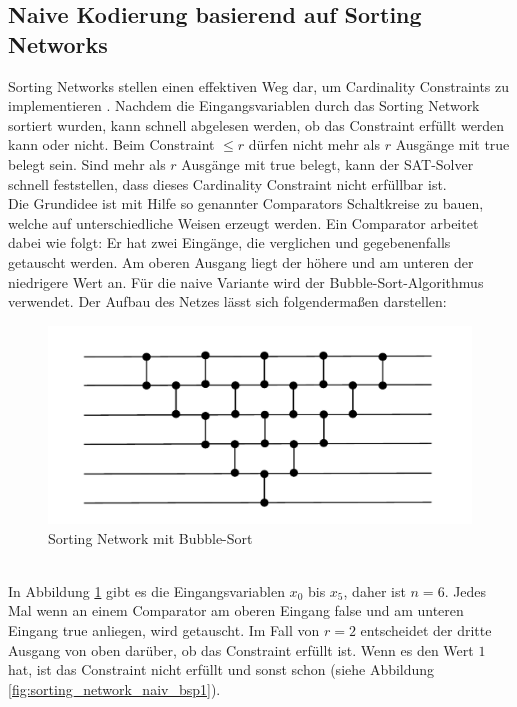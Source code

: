 \documentclass[a4,abstract=on]{scrartcl}
\begin{document}
	\subsection{Naive Kodierung basierend auf Sorting Networks}
Sorting Networks stellen einen effektiven Weg dar, um Cardinality Constraints zu implementieren \cite[vgl.][]{niklasse}. Nachdem die Eingangsvariablen durch das Sorting Network sortiert wurden, kann schnell abgelesen werden, ob das Constraint erfüllt werden kann oder nicht.
Beim Constraint $\leq r$ dürfen nicht mehr als $r$ Ausgänge mit true belegt sein. Sind mehr als $r$ Ausgänge mit true belegt, kann der SAT-Solver schnell feststellen, dass dieses Cardinality Constraint nicht erfüllbar ist.\\
Die Grundidee ist mit Hilfe so genannter Comparators \cite[vgl.][]{algoDpll} Schaltkreise zu bauen, welche auf unterschiedliche Weisen erzeugt werden. Ein Comparator arbeitet dabei wie folgt: Er hat zwei Eingänge, die verglichen und gegebenenfalls getauscht werden. Am oberen Ausgang liegt der höhere und am unteren der niedrigere Wert an.
Für die naive Variante wird der Bubble-Sort-Algorithmus \cite[vgl.][]{bubble} verwendet. Der Aufbau des Netzes lässt sich folgendermaßen darstellen:\\

\begin{figure}[H]
\centering
\includegraphics[width=\textwidth]{sorting_network_bubble.pdf}
\caption{Sorting Network mit Bubble-Sort}
\label{fig:sorting_network_naiv_bsp}
\end{figure}
\ \\
In Abbildung \ref{fig:sorting_network_naiv_bsp} gibt es die Eingangsvariablen $x_0$ bis $x_5$, daher ist $n=6$. Jedes Mal wenn an einem Comparator am oberen Eingang false und am unteren Eingang true anliegen, wird getauscht. Im Fall von $r=2$ entscheidet der dritte Ausgang von oben darüber, ob das Constraint erfüllt ist. Wenn es den Wert $1$ hat, ist das Constraint nicht erfüllt und sonst schon (siehe Abbildung \ref{fig:sorting_network_naiv_bsp1}).
\end{document}

